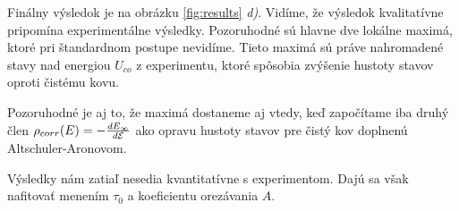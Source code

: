 Finálny výsledok je na obrázku \ref{fig:results} {\it d)}. Vidíme, že výsledok kvalitatívne pripomína experimentálne výsledky. Pozoruhodné sú hlavne dve lokálne maximá, ktoré pri štandardnom postupe nevidíme. Tieto maximá sú práve nahromadené stavy nad energiou $U_{co}$ z experimentu, ktoré spôsobia zvýšenie hustoty stavov oproti čistému kovu. 

Pozoruhodné je aj to, že maximá dostaneme aj vtedy, keď započítame iba druhý člen  $\rho_{corr}(E)=-\frac{dE_{\infty}}{d\mathcal{E}}$ ako opravu hustoty stavov pre čistý kov doplnenú Altschuler-Aronovom.

Výsledky nám zatiaľ nesedia kvantitatívne s experimentom. Dajú sa však nafitovať menením $\tau_0$ a koeficientu orezávania $A$.
